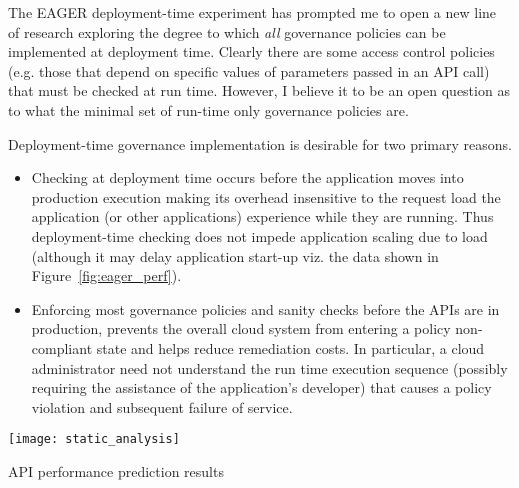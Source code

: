 The EAGER deployment-time experiment has prompted me to open a new line of
research exploring the degree to which {\em all} governance policies can be
implemented at deployment time.  Clearly there are some access control
policies (e.g. those that depend on specific values of parameters passed in an
API call) that must be checked at run time.  However, I believe it to be an
open question as to what the minimal set of run-time only governance policies
are.

Deployment-time governance implementation
is desirable for two primary reasons.

\begin{itemize}
\item Checking at deployment time occurs before the application moves into
production execution making its overhead insensitive to the request load 
the application
(or other applications) experience while they are running.  Thus
deployment-time checking does not impede application scaling due to load
(although it may delay application start-up viz. the data shown in
Figure~\ref{fig:eager_perf}).
\item Enforcing most governance policies and sanity checks before the APIs are in production,
prevents the overall cloud system from entering a policy non-compliant state and helps reduce
remediation costs.  In particular, a cloud administrator need not understand
the run time execution sequence (possibly requiring the assistance of the
application's developer) that causes a policy violation and subsequent failure
of service.
\end{itemize}

\begin{floatingfigure}[rb]{2.8in}
\vspace{-0.1in}
\texttt{[image: static\_analysis]}
\vspace{-0.08in}
\caption{API performance prediction results\label{fig:static_analysis}}
\end{floatingfigure}

